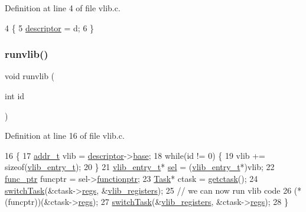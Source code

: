 Definition at line 4 of file vlib.\+c.


\begin{DoxyCode}
4                                   \{
5     \hyperlink{a00137_abe9fbaaf473cf2fa8d2a0ef1786fabd2_abe9fbaaf473cf2fa8d2a0ef1786fabd2}{descriptor} = d;
6 \}
\end{DoxyCode}
\mbox{\label{a00137_a6889af26c1cca94090023d5975955cbf_a6889af26c1cca94090023d5975955cbf}} 
\subsubsection{\texorpdfstring{runvlib()}{runvlib()}}
{\footnotesize\ttfamily void runvlib (\begin{DoxyParamCaption}\item[{int}]{id }\end{DoxyParamCaption})}



Definition at line 16 of file vlib.\+c.


\begin{DoxyCode}
16                      \{
17     \hyperlink{a00104_a295f71165288684c38c6bb836fbb3c59_a295f71165288684c38c6bb836fbb3c59}{addr\_t} vlib = \hyperlink{a00137_abe9fbaaf473cf2fa8d2a0ef1786fabd2_abe9fbaaf473cf2fa8d2a0ef1786fabd2}{descriptor}->\hyperlink{a00195_a0a6151ac18d60c648baec065efc9af1a_a0a6151ac18d60c648baec065efc9af1a}{base};
18     \textcolor{keywordflow}{while}(\textcolor{keywordtype}{id} != 0) \{
19         vlib += \textcolor{keyword}{sizeof}(\hyperlink{a00137_a97c1a7136f2ab06368e93c2d7533d619_a97c1a7136f2ab06368e93c2d7533d619}{vlib\_entry\_t});
20     \}
21     \hyperlink{a00191}{vlib\_entry\_t}* \hyperlink{a00077_af0b0a7e10694e3b600c7561311cc8271_af0b0a7e10694e3b600c7561311cc8271}{sel} = (\hyperlink{a00191}{vlib\_entry\_t}*)vlib;
22     \hyperlink{a00104_a5e730b1100d491afc6fa17d12fcd15a8_a5e730b1100d491afc6fa17d12fcd15a8}{func\_ptr} funcptr = sel->\hyperlink{a00191_abf69fb4a112a5bf0ccf2b441c1038f0d_abf69fb4a112a5bf0ccf2b441c1038f0d}{functionptr};
23     \hyperlink{a00151}{Task}* ctask = \hyperlink{a00056_a5913e9b2190b2b4118ee020721a320e2_a5913e9b2190b2b4118ee020721a320e2}{getctask}();
24     \hyperlink{a00059_a2425ca34147fccde2d1503332d21c5bd_a2425ca34147fccde2d1503332d21c5bd}{switchTask}(&ctask->\hyperlink{a00151_a136b243ee52ff89e9ba97f4e4dba19bb_a136b243ee52ff89e9ba97f4e4dba19bb}{regs}, &\hyperlink{a00137_ae94a2076c3fb43c35d18daf9cf664e23_ae94a2076c3fb43c35d18daf9cf664e23}{vlib\_registers});
25     \textcolor{comment}{// we can now run vlib code}
26     (*(funcptr))(&ctask->\hyperlink{a00151_a136b243ee52ff89e9ba97f4e4dba19bb_a136b243ee52ff89e9ba97f4e4dba19bb}{regs});
27     \hyperlink{a00059_a2425ca34147fccde2d1503332d21c5bd_a2425ca34147fccde2d1503332d21c5bd}{switchTask}(&\hyperlink{a00137_ae94a2076c3fb43c35d18daf9cf664e23_ae94a2076c3fb43c35d18daf9cf664e23}{vlib\_registers}, &ctask->\hyperlink{a00151_a136b243ee52ff89e9ba97f4e4dba19bb_a136b243ee52ff89e9ba97f4e4dba19bb}{regs});
28 \}
\end{DoxyCode}


